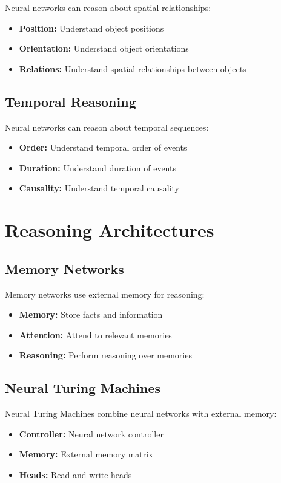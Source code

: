 Neural networks can reason about spatial relationships:
\begin{itemize}
    \item \textbf{Position:} Understand object positions
    \item \textbf{Orientation:} Understand object orientations
    \item \textbf{Relations:} Understand spatial relationships between objects
\end{itemize}

\subsection{Temporal Reasoning}

Neural networks can reason about temporal sequences:
\begin{itemize}
    \item \textbf{Order:} Understand temporal order of events
    \item \textbf{Duration:} Understand duration of events
    \item \textbf{Causality:} Understand temporal causality
\end{itemize}

\section{Reasoning Architectures}

\subsection{Memory Networks}

Memory networks use external memory for reasoning:
\begin{itemize}
    \item \textbf{Memory:} Store facts and information
    \item \textbf{Attention:} Attend to relevant memories
    \item \textbf{Reasoning:} Perform reasoning over memories
\end{itemize}

\subsection{Neural Turing Machines}

Neural Turing Machines combine neural networks with external memory:
\begin{itemize}
    \item \textbf{Controller:} Neural network controller
    \item \textbf{Memory:} External memory matrix
    \item \textbf{Heads:} Read and write heads
\end{itemize}

